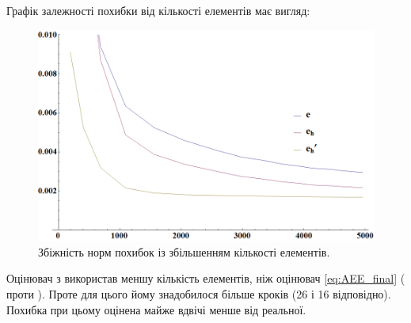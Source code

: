 \clearpage
Графік залежності похибки від кількості елементів має вигляд:

\begin{figure}[H]
	\centering
    \includegraphics[width=\textwidth]{problem2/ost/Plotnb}
    \caption{Збіжність норм похибок із збільшенням кількості елементів.}
    \label{fig:p2_ost_errors}
\end{figure}
Оцінювач з \cite{OstShynAee11} використав меншу кількість елементів, ніж оцінювач \eqref{eq:AEE_final} ( проти ). Проте для цього йому знадобилося більше кроків (26 і 16 відповідно). Похибка при цьому оцінена майже вдвічі менше від реальної.

